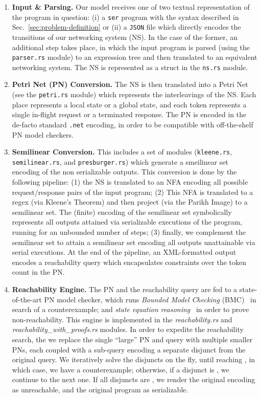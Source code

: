 \begin{enumerate}
	\item \textbf{Input \& Parsing.} Our model receives one of two textual representation of the program in question: (i) a \texttt{ser} program with the syntax described in Sec.~\ref{sec:problem-definition} or (ii) a \texttt{JSON} file which directly encodes the transitions of our networking system (NS). In the case of the former, an additional step takes place, in which the input program is parsed (using the \texttt{parser.rs} module) to an expression tree and then translated to an equivalent networking system. The NS is represented as a struct in the \texttt{ns.rs} module. 
	
	\item \textbf{Petri Net (PN) Conversion.} The NS is then translated into a Petri Net (see the \texttt{petri.rs} module) which represents the interleavings of the NS. Each place represents a local state or a global state, and each token represents a single in-flight request or a terminated response. The PN is encoded in the de-facto standard \texttt{.net} encoding, in order to be compatible with off-the-shelf PN model checkers. 
	
	\item \textbf{Semilinear Conversion.} 
	This includes a set of modules (\texttt{kleene.rs}, \texttt{semilinear.rs}, and \texttt{presburger.rs}) which generate a smeilinear set encoding of the non serializable outputs. This conversion is done by the following pipeline: (1) the NS is translated to an NFA encoding all possible request/response pairs of the input program; (2) This NFA is translated to a regex (via Kleene's Theorem) and then project (via the Parikh Image) to a semilinear set. The (finite) encoding of the semilinear set symbolically represents all outputs attained via serializable executions of the program, running for an unbounded number of steps; (3) finally, we complement the semilinear set to attain a semilinear set encoding all outputs unattainable via serial executions. At the end of the pipeline, an {XML}-formatted output encodes a reachability query which encapsulates constraints over the token count in the PN.
	
	
	\item \textbf{Reachability Engine.} The PN and the reachability query are fed to a state-of-the-art PN model checker, which runs \textit{Bounded Model Checking} (BMC)~\cite{biere_symbolic_1999} in search of a counterexample; and \textit{state equation reasoning}~\cite{murata_state_1977} in order to prove non-reachability. This engine is implemented in the \textit{reachability.rs} and \textit{reachability\_with\_proofs.rs}  modules.
	In order to expedite the reachability search, the we replace the single ``large'' PN and query with multiple smaller PNs, each coupled with a sub-query encoding a separate disjunct from the original query.
	We iteratively solve the disjuncts on the fly, until reaching \sat, in which case, we have a counterexample; otherwise, if a disjunct is \unsat, we continue to the next one. If all disjuncts are \unsat, we render the original encoding as unreachable, and the original program as serializable.
	

\end{enumerate}
